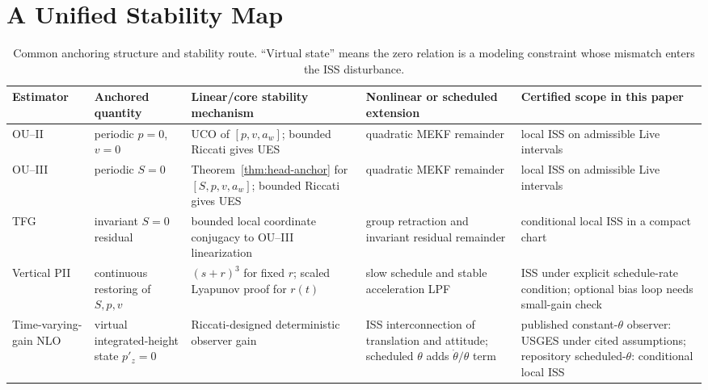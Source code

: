 \documentclass[conference]{IEEEtran}
\theoremstyle{remark}
\begin{document}
\section{A Unified Stability Map}

\begin{table}[t]
\centering
\caption{Common anchoring structure and stability route.  ``Virtual state'' means the zero relation is a modeling constraint whose mismatch enters the ISS disturbance.}
\label{tab:unified-map}
\footnotesize
\setlength{\tabcolsep}{4pt}
\begin{tabular}{@{}p{}p{}p{}p{}p{}@{}}
\toprule
Estimator & Anchored quantity & Linear/core stability mechanism & Nonlinear or scheduled extension & Certified scope in this paper \\
\midrule
OU--II & periodic $p=0$, $v=0$ & UCO of $[p,v,a_w]$; bounded Riccati gives UES & quadratic MEKF remainder & local ISS on admissible Live intervals \\
OU--III & periodic $S=0$ & Theorem~\ref{thm:head-anchor} for $[S,p,v,a_w]$; bounded Riccati gives UES & quadratic MEKF remainder & local ISS on admissible Live intervals \\
TFG & invariant $S=0$ residual & bounded local coordinate conjugacy to OU--III linearization & group retraction and invariant residual remainder & conditional local ISS in a compact chart \\
Vertical PII & continuous restoring of $S,p,v$ & $(s+r)^3$ for fixed $r$; scaled Lyapunov proof for $r(t)$ & slow schedule and stable acceleration LPF & ISS under explicit schedule-rate condition; optional bias loop needs small-gain check \\
Time-varying-gain NLO & virtual integrated-height state $p'_z=0$ & Riccati-designed deterministic observer gain & ISS interconnection of translation and attitude; scheduled $\theta$ adds $\dot\theta/\theta$ term & published constant-$\theta$ observer: USGES under cited assumptions; repository scheduled-$\theta$: conditional local ISS \\
\bottomrule
\end{tabular}
\end{table}
\end{document}
